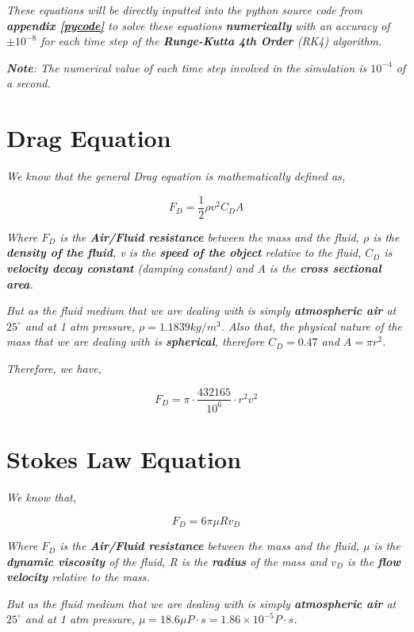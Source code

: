     \textit{These equations will be directly inputted into the python source code from \textbf{appendix \ref{pycode}} to solve these equations \textbf{numerically} with an accuracy of $\pm 10^{-8}$ for each time step of the \textbf{Runge-Kutta 4th Order} (RK4) algorithm.}
           
	\textit{\textbf{Note}: The numerical value of each time step involved in the simulation is $10^{-4}$ of a second.}
           
\section{{Drag Equation}}
            
    \textit{We know that the general Drag equation is mathematically defined as,}
            
        $$F_D = \frac{1}{2}\rho v^2C_DA$$
           
    \textit{Where $F_D$ is the \textbf{Air/Fluid resistance} between the mass and the fluid, $\rho$ is the \textbf{density of the fluid}, v is the \textbf{speed of the object} relative to the fluid, $C_D$ is \textbf{velocity decay constant} (damping constant) and A is the \textbf{cross sectional area}.}
            
    \textit{But as the fluid medium that we are dealing with is simply \textbf{atmospheric air} at $25^\circ$ and at 1 atm pressure, $\rho = 1.1839 kg/m^3$. Also that, the physical nature of the mass that we are dealing with is \textbf{spherical}, therefore $C_D = 0.47$ and $A = \pi r^2$.}
            
    \textit{Therefore, we have,}
            
        $$F_D = \pi\cdot\frac{432165}{10^{6}}\cdot r^2v^2$$
            
\section{{Stokes Law Equation}}
            
    \textit{We know that,}
            
        $$F_D = 6\pi\mu Rv_D$$
            
    \textit{Where $F_D$ is the \textbf{Air/Fluid resistance} between the mass and the fluid, $\mu$ is the \textbf{dynamic viscosity} of the fluid, R is the \textbf{radius} of the mass and $v_D$ is the \textbf{flow velocity} relative to the mass.}
            
    \textit{But as the fluid medium that we are dealing with is simply \textbf{atmospheric air} at $25^\circ$ and at 1 atm pressure, $\mu = 18.6 \mu P\cdot s = 1.86 \times 10^{-5} P\cdot s$.}
            
